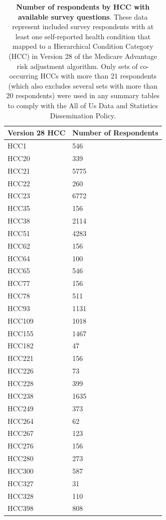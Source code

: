 \documentclass[
  12pt,
  number,
  doubleblind]{elsarticle}
\begin{document}
\newpage{}

\begin{longtable}[]{@{}ll@{}}

\caption{\label{tbl-num-repondents}\textbf{Number of respondents by HCC
with available survey questions}. These data represent included survey
respondents with at least one self-reported health condition that mapped
to a Hierarchical Condition Category (HCC) in Version 28 of the Medicare
Advantage risk adjustment algorithm. Only sets of co-occurring HCCs with
more than 21 respondents (which also excludes several sets with more
than 20 respondents) were used in any summary tables to comply with the
All of Us Data and Statistics Dissemination Policy.}

\tabularnewline

\toprule\noalign{}
Version 28 HCC & Number of Respondents \\
\midrule\noalign{}
\endhead
\bottomrule\noalign{}
\endlastfoot
HCC1 & 546 \\
HCC20 & 339 \\
HCC21 & 5775 \\
HCC22 & 260 \\
HCC23 & 6772 \\
HCC35 & 156 \\
HCC38 & 2114 \\
HCC51 & 4283 \\
HCC62 & 156 \\
HCC64 & 100 \\
HCC65 & 546 \\
HCC77 & 156 \\
HCC78 & 511 \\
HCC93 & 1131 \\
HCC109 & 1018 \\
HCC155 & 1467 \\
HCC182 & 47 \\
HCC221 & 156 \\
HCC226 & 73 \\
HCC228 & 399 \\
HCC238 & 1635 \\
HCC249 & 373 \\
HCC264 & 62 \\
HCC267 & 123 \\
HCC276 & 156 \\
HCC280 & 273 \\
HCC300 & 587 \\
HCC327 & 31 \\
HCC328 & 110 \\
HCC398 & 808 \\

\end{longtable}
\end{document}
